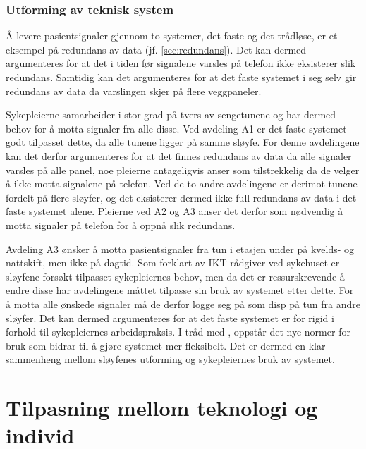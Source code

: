 \subsubsection{Utforming av teknisk system}
Å levere pasientsignaler gjennom to systemer, det faste og det trådløse, er et eksempel på redundans av data (jf. \ref{sec:redundans}). Det kan dermed argumenteres for at det i tiden før signalene varsles på telefon ikke eksisterer slik redundans. Samtidig kan det argumenteres for at det faste systemet i seg selv gir redundans av data da varslingen skjer på flere veggpaneler. 

\noindent
Sykepleierne samarbeider i stor grad på tvers av sengetunene og har dermed behov for å motta signaler fra alle disse. Ved avdeling A1 er det faste systemet godt tilpasset dette, da alle tunene ligger på samme sløyfe. For denne avdelingene kan det derfor argumenteres for at det finnes redundans av data da alle signaler varsles på alle panel, noe pleierne antageligvis anser som tilstrekkelig da de velger å ikke motta signalene på telefon. Ved de to andre avdelingene er derimot tunene fordelt på flere sløyfer, og det eksisterer dermed ikke full redundans av data i det faste systemet alene. Pleierne ved A2 og A3 anser det derfor som nødvendig å motta signaler på telefon for å oppnå slik redundans. 

\noindent
Avdeling A3 ønsker å motta pasientsignaler fra tun i etasjen under på kvelds- og nattskift, men ikke på dagtid. Som forklart av IKT-rådgiver ved sykehuset er sløyfene forsøkt tilpasset sykepleiernes behov, men da det er ressurskrevende å endre disse har avdelingene måttet tilpasse sin bruk av systemet etter dette. For å motta alle ønskede signaler må de derfor logge seg på som disp på tun fra andre sløyfer. Det kan dermed argumenteres for at det faste systemet er for rigid i forhold til sykepleiernes arbeidspraksis. I tråd med \citep{Ackermann00}, oppstår det nye normer for bruk som bidrar til å gjøre systemet mer fleksibelt. Det er dermed en klar sammenheng mellom sløyfenes utforming og sykepleiernes bruk av systemet.

\section{Tilpasning mellom teknologi og individ}

